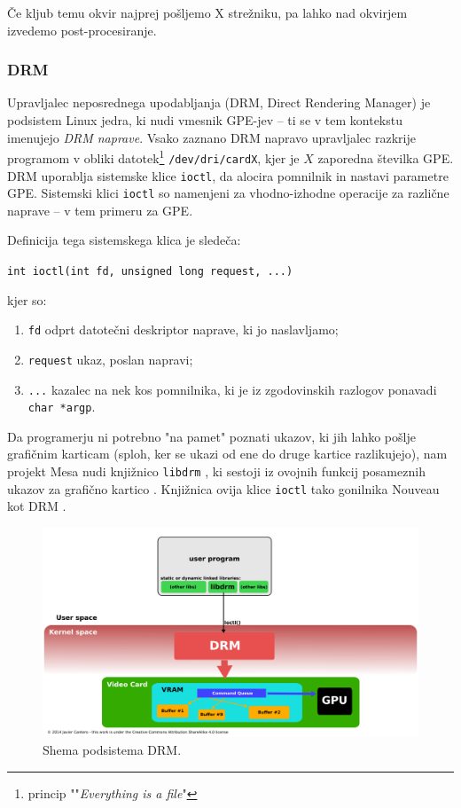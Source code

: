 \documentclass{article}
\begin{document}
Če kljub temu okvir najprej pošljemo X strežniku, pa lahko nad okvirjem izvedemo post-procesiranje.

\subsubsection{DRM}
Upravljalec neposrednega upodabljanja (DRM, Direct Rendering Manager) \autocite{drm} je podsistem Linux jedra, ki nudi vmesnik GPE-jev -- ti se v tem kontekstu imenujejo \textit{DRM naprave}. Vsako zaznano DRM napravo upravljalec razkrije programom v obliki datotek\footnote{princip ""\textit{Everything is a file}"} \texttt{/dev/dri/cardX}, kjer je $X$ zaporedna številka GPE. DRM uporablja sistemske klice \texttt{ioctl}, da alocira pomnilnik in nastavi parametre GPE. Sistemski klici \texttt{ioctl} so namenjeni za vhodno-izhodne operacije za različne naprave -- v tem primeru za GPE.

Definicija tega sistemskega klica je sledeča:\\

\centerline{\texttt{int ioctl(int fd, unsigned long request, ...)} \autocite{ioctldef}}

kjer so:

\begin{enumerate}[label=\arabic*.]
    \item \texttt{fd} odprt datotečni deskriptor naprave, ki jo naslavljamo;
    \item \texttt{request} ukaz, poslan napravi;
    \item \texttt{...} kazalec na nek kos pomnilnika, ki je iz zgodovinskih razlogov ponavadi \texttt{char *argp}.
\end{enumerate}

Da programerju ni potrebno "na pamet" poznati ukazov, ki jih lahko pošlje grafičnim karticam (sploh, ker se ukazi od ene do druge kartice razlikujejo), nam projekt Mesa nudi knjižnico \texttt{libdrm} \autocite[poglavje \textit{Software architecture}]{libdrm}, ki sestoji iz ovojnih funkcij posameznih ukazov za grafično kartico \autocite{drm}. Knjižnica ovija klice \texttt{ioctl} tako gonilnika Nouveau kot DRM \autocite{nouveauinstall}.

\begin{figure}[H]
    \centering
    \includegraphics[width=0.75\linewidth]{High_level_Overview_of_DRM}
    \caption{Shema podsistema DRM. \autocite{fig:drmscheme}}
\end{figure}
\end{document}
